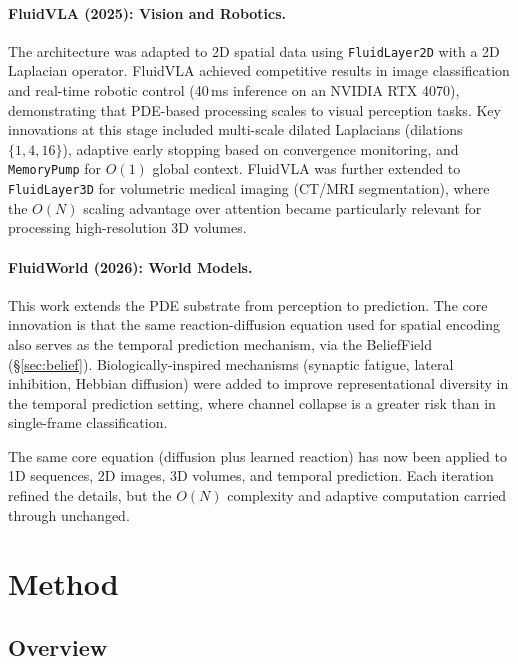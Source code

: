 \documentclass{article}
\begin{document}
\paragraph{FluidVLA (2025): Vision and Robotics.} The architecture was adapted to 2D spatial data using \texttt{FluidLayer2D} with a 2D Laplacian operator. FluidVLA achieved competitive results in image classification and real-time robotic control (40\,ms inference on an NVIDIA RTX 4070), demonstrating that PDE-based processing scales to visual perception tasks. Key innovations at this stage included multi-scale dilated Laplacians (dilations $\{1, 4, 16\}$), adaptive early stopping based on convergence monitoring, and \texttt{MemoryPump} for $O(1)$ global context. FluidVLA was further extended to \texttt{FluidLayer3D} for volumetric medical imaging (CT/MRI segmentation), where the $O(N)$ scaling advantage over attention became particularly relevant for processing high-resolution 3D volumes.

\paragraph{FluidWorld (2026): World Models.} This work extends the PDE substrate from perception to prediction. The core innovation is that the same reaction-diffusion equation used for spatial encoding also serves as the temporal prediction mechanism, via the BeliefField (\S\ref{sec:belief}). Biologically-inspired mechanisms (synaptic fatigue, lateral inhibition, Hebbian diffusion) were added to improve representational diversity in the temporal prediction setting, where channel collapse is a greater risk than in single-frame classification.

The same core equation (diffusion plus learned reaction) has now been applied to 1D sequences, 2D images, 3D volumes, and temporal prediction. Each iteration refined the details, but the $O(N)$ complexity and adaptive computation carried through unchanged.

\section{Method}
\label{sec:method}

\subsection{Overview}
\end{document}
